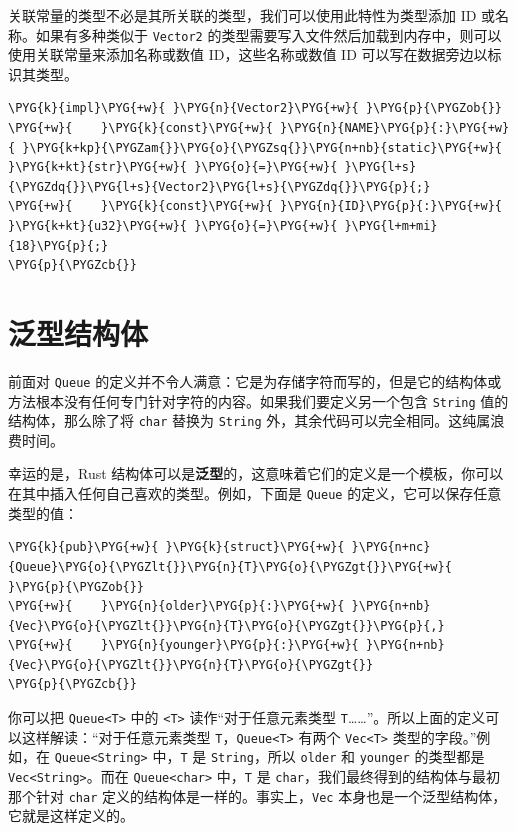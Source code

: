 关联常量的类型不必是其所关联的类型，我们可以使用此特性为类型添加 ID 或名称。如果有多种类似于 \texttt{Vector2} 的类型需要写入文件然后加载到内存中，则可以使用关联常量来添加名称或数值 ID，这些名称或数值 ID 可以写在数据旁边以标识其类型。

\begin{Verbatim}[commandchars=\\\{\},breaklines=true,breakanywhere=true,fontsize=\codefont,xleftmargin=17bp]
\PYG{k}{impl}\PYG{+w}{ }\PYG{n}{Vector2}\PYG{+w}{ }\PYG{p}{\PYGZob{}}
\PYG{+w}{    }\PYG{k}{const}\PYG{+w}{ }\PYG{n}{NAME}\PYG{p}{:}\PYG{+w}{ }\PYG{k+kp}{\PYGZam{}}\PYG{o}{\PYGZsq{}}\PYG{n+nb}{static}\PYG{+w}{ }\PYG{k+kt}{str}\PYG{+w}{ }\PYG{o}{=}\PYG{+w}{ }\PYG{l+s}{\PYGZdq{}}\PYG{l+s}{Vector2}\PYG{l+s}{\PYGZdq{}}\PYG{p}{;}
\PYG{+w}{    }\PYG{k}{const}\PYG{+w}{ }\PYG{n}{ID}\PYG{p}{:}\PYG{+w}{ }\PYG{k+kt}{u32}\PYG{+w}{ }\PYG{o}{=}\PYG{+w}{ }\PYG{l+m+mi}{18}\PYG{p}{;}
\PYG{p}{\PYGZcb{}}
\end{Verbatim}

\section{泛型结构体}

前面对 \texttt{Queue} 的定义并不令人满意：它是为存储字符而写的，但是它的结构体或方法根本没有任何专门针对字符的内容。如果我们要定义另一个包含 \texttt{String} 值的结构体，那么除了将 \texttt{char} 替换为 \texttt{String} 外，其余代码可以完全相同。这纯属浪费时间。

幸运的是，Rust 结构体可以是\textbf{泛型}的，这意味着它们的定义是一个模板，你可以在其中插入任何自己喜欢的类型。例如，下面是 \texttt{Queue} 的定义，它可以保存任意类型的值：

\begin{Verbatim}[commandchars=\\\{\},breaklines=true,breakanywhere=true,fontsize=\codefont,xleftmargin=17bp]
\PYG{k}{pub}\PYG{+w}{ }\PYG{k}{struct}\PYG{+w}{ }\PYG{n+nc}{Queue}\PYG{o}{\PYGZlt{}}\PYG{n}{T}\PYG{o}{\PYGZgt{}}\PYG{+w}{ }\PYG{p}{\PYGZob{}}
\PYG{+w}{    }\PYG{n}{older}\PYG{p}{:}\PYG{+w}{ }\PYG{n+nb}{Vec}\PYG{o}{\PYGZlt{}}\PYG{n}{T}\PYG{o}{\PYGZgt{}}\PYG{p}{,}
\PYG{+w}{    }\PYG{n}{younger}\PYG{p}{:}\PYG{+w}{ }\PYG{n+nb}{Vec}\PYG{o}{\PYGZlt{}}\PYG{n}{T}\PYG{o}{\PYGZgt{}}
\PYG{p}{\PYGZcb{}}
\end{Verbatim}

你可以把 \texttt{Queue<T>} 中的 \texttt{<T>} 读作“对于任意元素类型 \texttt{T}……”。所以上面的定义可以这样解读：“对于任意元素类型 \texttt{T}，\texttt{Queue<T>} 有两个 \texttt{Vec<T>} 类型的字段。”例如，在 \texttt{Queue<String>} 中，\texttt{T} 是 \texttt{String}，所以 \texttt{older} 和 \texttt{younger} 的类型都是 \texttt{Vec<String>}。而在 \texttt{Queue<char>} 中，\texttt{T} 是 \texttt{char}，我们最终得到的结构体与最初那个针对 \texttt{char} 定义的结构体是一样的。事实上，\texttt{Vec} 本身也是一个泛型结构体，它就是这样定义的。

